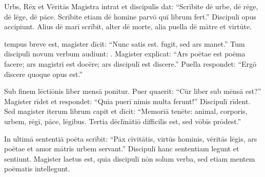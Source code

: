\documentclass[12pt]{nextbook}
\begin{document}
\begin{readersection}{Urbs, Rēx et Vēritās}
Magistra intrat et  discipulīs dat: “Scrībite dē urbe, dē rēge, dē lēge, dē pāce. Scrībite etiam dē homine parvō quī librum fert.” Discipulī opus accipiunt. Alius dē marī scrībit, alter dē morte, alia puella dē mātre et virtūte.

 tempus breve est, magister dīcit: “Nunc satis est.  fugit, sed ars manet.” Tum discipulī novum verbum audiunt: . Magister explicat: “Ars poētae est poēma facere; ars magistrī est docēre; ars discipulī est discere.” Puella respondet: “Ergō discere quoque opus est.”

Sub finem lēctiōnis liber  mensā ponitur. Puer quaerit: “Cūr liber sub mēnsā est?” Magister rīdet et respondet: “Quia puerī nimis multa ferunt!” Discipulī rīdent. Sed magister iterum librum capit et dīcit: “Memoriā tenēte: animal, corporis, urbem, rēgī, pāce, lēgibus. Tertia dēclīnātiō difficilis est, sed vōbīs prōdest.”

In ultimā sententiā poēta scrībit: “Pāx cīvitātis, virtūs hominis, vēritās lēgis, ars poētae et amor mātris urbem servant.” Discipulī hanc sententiam legunt et sentiunt. Magister laetus est, quia discipulī nōn solum verba, sed etiam mentem poēmatis intellegunt.

\end{readersection}
\end{document}
